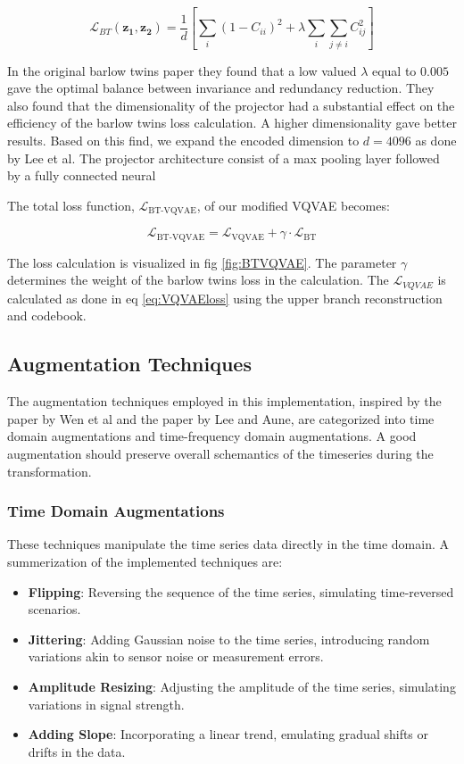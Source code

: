 \begin{equation}
\mathcal{L}_{BT}(\mathbf{z_1}, \mathbf{z_2}) =\frac{1}{d} \left[ \sum_i (1 - C_{ii})^2 + \lambda \sum_i \sum_{j \neq i} C_{ij}^2\right]
\end{equation}

In the original barlow twins paper\cite{Barlow} they found that a low valued $\lambda$ equal to $0.005$ gave the optimal balance between invariance and redundancy reduction. They also found that the dimensionality of the projector had a substantial effect on the 
efficiency of the barlow twins loss calculation. A higher dimensionality gave better results. Based on this find, we expand the encoded dimension to $d=4096$ as done by Lee et al\cite{SSLs}. 
The projector architecture consist of a max pooling layer followed by a fully connected neural

The total loss function, $\mathcal{L}_{\text{BT-VQVAE}}$, of our modified VQVAE becomes:

\begin{equation}
    \mathcal{L}_{\text{BT-VQVAE}} = \mathcal{L}_{\text{VQVAE}} + \gamma \cdot \mathcal{L}_\text{BT}
    \label{eq:BTVQVAEloss}
\end{equation}

The loss calculation is visualized in fig \ref{fig:BTVQVAE}. The parameter $\gamma$ determines the weight of the barlow twins loss in the calculation. The $\mathcal{L}_{VQVAE}$ is calculated as done in eq \ref{eq:VQVAEloss} using the upper branch reconstruction and codebook.

\subsection{Augmentation Techniques}
The augmentation techniques employed in this implementation, inspired by the paper by Wen et al\cite{augs} and the paper by Lee and Aune\cite{SSLs}, are categorized into time domain augmentations and time-frequency domain augmentations. 
A good augmentation should preserve overall schemantics of the timeseries during the transformation. 

\subsubsection*{Time Domain Augmentations}
These techniques manipulate the time series data directly in the time domain. A summerization of the implemented techniques are:
\begin{itemize}
    \item \textbf{Flipping}: Reversing the sequence of the time series, simulating time-reversed scenarios.
    \item \textbf{Jittering}: Adding Gaussian noise to the time series, introducing random variations akin to sensor noise or measurement errors.
    \item \textbf{Amplitude Resizing}: Adjusting the amplitude of the time series, simulating variations in signal strength.
    \item \textbf{Adding Slope}: Incorporating a linear trend, emulating gradual shifts or drifts in the data.
\end{itemize}

